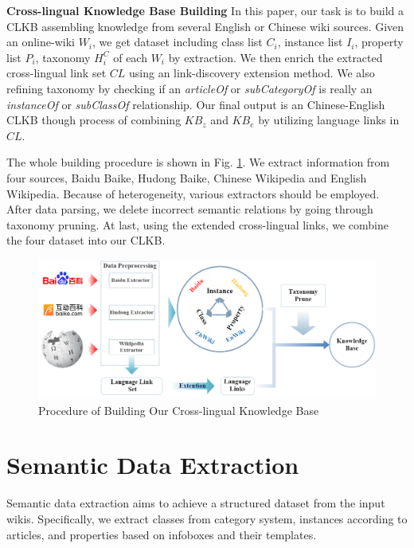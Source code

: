 \documentclass[runningheads,a4paper]{llncs}
\newcommand{\para}[1]{\vspace{0.1cm}\noindent\textbf{#1}}
\begin{document}
\para{Cross-lingual Knowledge Base Building} In this paper, our task is to build a CLKB assembling knowledge from several English or Chinese wiki sources. Given an online-wiki $W_{i}$, we get dataset including class list $C_{i}$, instance list $I_{i}$, property list $P_{i}$, taxonomy $H^C_{i}$ of each $W_{i}$ by extraction. We then enrich the extracted cross-lingual link set $CL$ using an link-discovery extension method. We also refining taxonomy by checking if an \textit{articleOf} or \textit{subCategoryOf} is really an \textit{instanceOf} or \textit{subClassOf} relationship. Our final output is an Chinese-English CLKB though process of combining $KB_{z}$ and $KB_{e}$ by utilizing language links in $CL$.

The whole building procedure is shown in Fig. \ref{fig:procedure}. We extract information from four sources, Baidu Baike, Hudong Baike, Chinese Wikipedia and English Wikipedia. Because of heterogeneity, various extractors should be employed. After data parsing, we delete incorrect semantic relations by going through taxonomy pruning. At last, using the extended cross-lingual links, we combine the four dataset into our CLKB.

\vspace{-0.5cm}
\begin{figure}[ht]
    \centerline{\includegraphics[width=1\columnwidth]{fig/procedure2}}
    \caption{Procedure of Building Our Cross-lingual Knowledge Base}
    \label{fig:procedure}
\end{figure}
\vspace{-0.5cm}

\section{Semantic Data Extraction}
\label{sec:sde}
Semantic data extraction aims to achieve a structured dataset from the input wikis. Specifically, we extract classes from category system, instances according to articles, and properties based on infoboxes and their templates.
\end{document}
